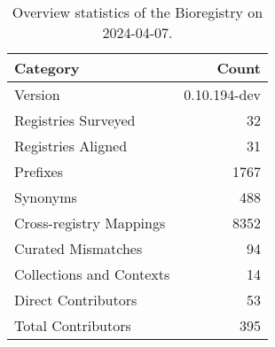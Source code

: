 \begin{table}
\caption{Overview statistics of the Bioregistry on 2024-04-07.}
\label{tab:bioregistry-summary}
\begin{tabular}{lr}
\toprule
Category & Count \\
\midrule
Version & 0.10.194-dev \\
Registries Surveyed & 32 \\
Registries Aligned & 31 \\
Prefixes & 1767 \\
Synonyms & 488 \\
Cross-registry Mappings & 8352 \\
Curated Mismatches & 94 \\
Collections and Contexts & 14 \\
Direct Contributors & 53 \\
Total Contributors & 395 \\
\bottomrule
\end{tabular}
\end{table}
